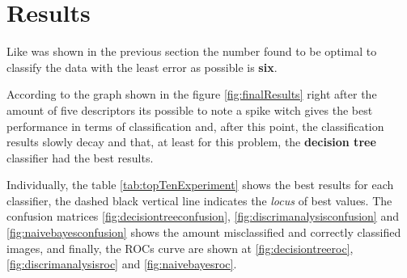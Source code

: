 \documentclass[conference]{IEEEtran}
\begin{document}
	\section{Results}
        \par Like was shown in the previous section the number found to be optimal to classify the data with the least error as possible is \textbf{six}.

		\par According to the graph shown in the figure \ref{fig:finalResults} right after the amount of five descriptors its possible to note a spike witch gives the best performance in terms of classification and, after this point, the classification results slowly decay and that, at least for this problem, the \textbf{decision tree} classifier had the best results.
		
		\par Individually, the table \ref{tab:topTenExperiment} shows the best results for each classifier, the dashed black vertical line indicates the \textit{locus} of best values. The confusion matrices \ref{fig:decisiontreeconfusion}, \ref{fig:discrimanalysisconfusion} and \ref{fig:naivebayesconfusion} shows the amount misclassified and correctly classified images, and finally, the ROCs curve are shown at \ref{fig:decisiontreeroc}, \ref{fig:discrimanalysisroc} and \ref{fig:naivebayesroc}.
	
\end{document}
